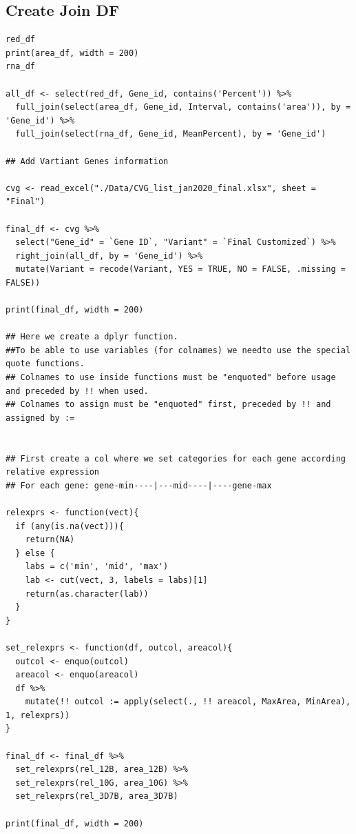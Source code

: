 \documentclass[11pt]{article}
\begin{document}
\subsection{Create Join DF}
\label{sec:orgf312f5e}
\begin{verbatim}
red_df
print(area_df, width = 200)
rna_df

all_df <- select(red_df, Gene_id, contains('Percent')) %>%
  full_join(select(area_df, Gene_id, Interval, contains('area')), by = 'Gene_id') %>%
  full_join(select(rna_df, Gene_id, MeanPercent), by = 'Gene_id')

## Add Vartiant Genes information

cvg <- read_excel("./Data/CVG_list_jan2020_final.xlsx", sheet = "Final")

final_df <- cvg %>%
  select("Gene_id" = `Gene ID`, "Variant" = `Final Customized`) %>%
  right_join(all_df, by = 'Gene_id') %>%
  mutate(Variant = recode(Variant, YES = TRUE, NO = FALSE, .missing = FALSE))

print(final_df, width = 200)

## Here we create a dplyr function.
##To be able to use variables (for colnames) we needto use the special quote functions.
## Colnames to use inside functions must be "enquoted" before usage and preceded by !! when used.
## Colnames to assign must be "enquoted" first, preceded by !! and assigned by :=


## First create a col where we set categories for each gene according relative expression
## For each gene: gene-min----|---mid----|----gene-max

relexprs <- function(vect){
  if (any(is.na(vect))){
    return(NA)
  } else {
    labs = c('min', 'mid', 'max')
    lab <- cut(vect, 3, labels = labs)[1]
    return(as.character(lab))
  }
}

set_relexprs <- function(df, outcol, areacol){
  outcol <- enquo(outcol)
  areacol <- enquo(areacol)
  df %>%
    mutate(!! outcol := apply(select(., !! areacol, MaxArea, MinArea), 1, relexprs))
}

final_df <- final_df %>%
  set_relexprs(rel_12B, area_12B) %>%
  set_relexprs(rel_10G, area_10G) %>%
  set_relexprs(rel_3D7B, area_3D7B)

print(final_df, width = 200)
\end{verbatim}
\end{document}
